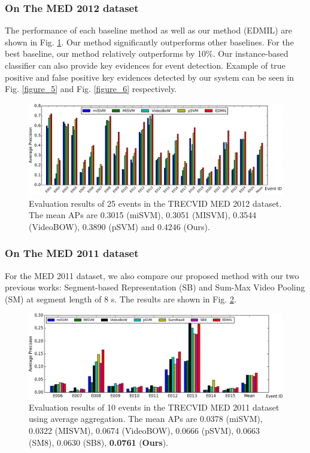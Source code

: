 \subsubsection{On The MED 2012 dataset}
The performance of each baseline method as well as our method (EDMIL) are shown in Fig. \ref{figure_4}. Our method significantly outperforms other baselines. For the best baseline, our method relatively outperforms by 10\%. Our instance-based classifier can also provide key evidences for event detection. Example of true positive and false positive key evidences detected by our system can be seen in Fig. \ref{figure_5} and Fig. \ref{figure_6} respectively. 

\begin{figure}
	\centering
	\includegraphics[width=1.1\textwidth]{figure_4.pdf}
	\caption{Evaluation results of 25 events in the TRECVID MED 2012 dataset. The mean APs are 0.3015 (miSVM), 0.3051 (MISVM), 0.3544 (VideoBOW), 0.3890 (pSVM) and 0.4246 (Ours).}
	\label{figure_4}
\end{figure}

\subsubsection{On The MED 2011 dataset}
For the MED 2011 dataset, we also compare our proposed method with our two previous works: Segment-based Representation (SB) and Sum-Max Video Pooling (SM) at segment length of 8 s. The results are shown in Fig. \ref{med11_sum}.

\begin{figure}
	\centering
	\includegraphics[width=1\textwidth]{med11_sum.png}
	\caption{Evaluation results of 10 events in the TRECVID MED 2011 dataset using average aggregation. The mean APs are 0.0378 (miSVM), 0.0322 (MISVM), 0.0674 (VideoBOW), 0.0666 (pSVM), 0.0663 (SM8), 0.0630 (SB8), \textbf{0.0761} (\textbf{Ours}).}
	\label{med11_sum}
\end{figure}

